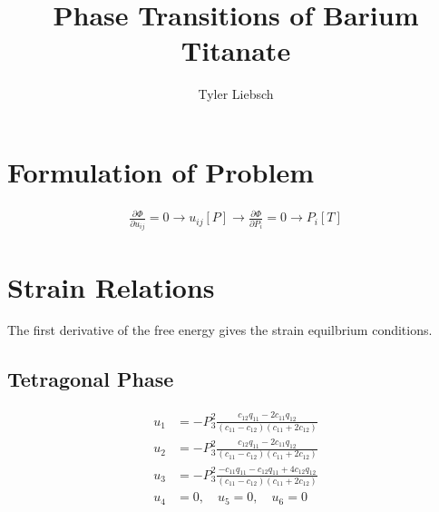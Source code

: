 \documentclass{article}
\title{Phase Transitions of Barium Titanate}
\author{Tyler Liebsch}
\begin{document}
\linespread{1.1}
\maketitle




\section{Formulation of Problem}
\begin{align}
\frac{\partial \Phi}{\partial u_{ij}}=0 \to u_{ij}[P]\to \frac{\partial \Phi}{\partial P_i}=0 \to P_i[T]
\end{align}


\section{Strain Relations}
\label{sec:Strain}
The first derivative of the free energy gives the strain equilbrium conditions.

\subsection{Tetragonal Phase}
\begin{align}
u_1 &= - P_3^2 \frac{c_{12} q_{11}-2 c_{11} q_{12}}{\left(c_{11}-c_{12}\right) \left(c_{11}+2 c_{12}\right)} \\
u_2 &= - P_3^2 \frac{c_{12}q_{11}-2 c_{11}  q_{12}}{\left(c_{11}-c_{12}\right) \left(c_{11}+2 c_{12}\right)} \\
u_3 &= -  P_3^2 \frac{-c_{11} q_{11}-c_{12}  q_{11}+4 c_{12} q_{12}}{\left(c_{11}-c_{12}\right) \left(c_{11}+2 c_{12}\right)} \\
u_4 &= 0, \quad u_5= 0, \quad u_6= 0
\end{align}
\end{document}
